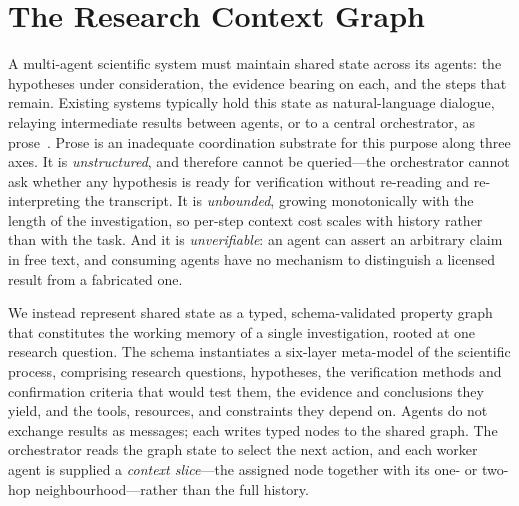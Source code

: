 \section{The Research Context Graph}
\label{sec:research-graph}

A multi-agent scientific system must maintain shared state across its agents: the
hypotheses under consideration, the evidence bearing on each, and the steps that
remain. Existing systems typically hold this state as natural-language
dialogue, relaying intermediate results between agents, or to a central
orchestrator, as
prose~\citep{boiko2023coscientist,google2025coscientist,swanson2025virtuallab}.
Prose is an inadequate coordination substrate for this purpose along three axes.
It is \emph{unstructured}, and therefore cannot be queried---the orchestrator
cannot ask whether any hypothesis is ready for verification without re-reading and
re-interpreting the transcript. It is \emph{unbounded}, growing monotonically with
the length of the investigation, so per-step context cost scales with history
rather than with the task. And it is \emph{unverifiable}: an agent can assert an
arbitrary claim in free text, and consuming agents have no mechanism to
distinguish a licensed result from a fabricated one.

We instead represent shared state as a typed, schema-validated property graph
that constitutes the working memory of a single investigation, rooted at one
research question. The schema instantiates a six-layer meta-model of the
scientific process, comprising research questions, hypotheses, the verification
methods and confirmation criteria that would test them, the evidence and
conclusions they yield, and the tools, resources, and constraints they depend on.
Agents do not exchange results as messages; each writes typed nodes to the shared
graph. The orchestrator reads the graph state to select the next action, and each
worker agent is supplied a \emph{context slice}---the assigned node together with
its one- or two-hop neighbourhood---rather than the full history.

